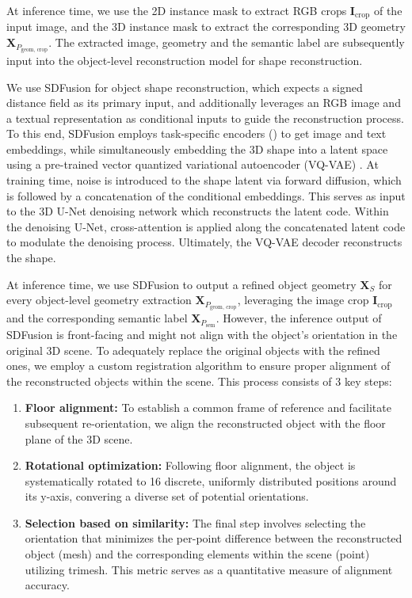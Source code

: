 At inference time, we use the 2D instance mask to extract RGB crops $\mathbf{I}_{\text{crop}}$ of the input image, and the 3D instance mask to extract the corresponding 3D geometry $\textbf{X}_{P_{\text{geom, crop}}}$.
The extracted image, geometry and the semantic label are subsequently input into the object-level reconstruction model for shape reconstruction.

We use SDFusion \citep{cheng2023sdfusion} for object shape reconstruction, which expects a signed distance field as its primary input, and additionally leverages an RGB image and a textual representation as conditional inputs to guide the reconstruction process. To this end, SDFusion employs task-specific encoders (\citep{radford2021learning, devlin2018bert}) to get image and text embeddings, while simultaneously embedding the 3D shape into a latent space using a pre-trained vector quantized variational autoencoder (VQ-VAE) \citep{oord2017neural}. At training time, noise is introduced to the shape latent via forward diffusion, which is followed by a concatenation of the conditional embeddings. This serves as input to the 3D U-Net \citep{cciccek20163d} denoising network which reconstructs the latent code. Within the denoising U-Net, cross-attention is applied along the concatenated latent code to modulate the denoising process. Ultimately, the VQ-VAE decoder reconstructs the shape.

At inference time, we use SDFusion to output a refined object geometry $\mathbf{X}_S$ for every object-level geometry extraction $\mathbf{X}_{P_{\text{geom, crop}}}$, leveraging the image crop $\mathbf{I}_{\text{crop}}$ and the corresponding semantic label $\mathbf{X}_{P_{\text{sem}}}$.
However, the inference output of SDFusion is front-facing and might not align with the object's orientation in the original 3D scene. To adequately replace the original objects with the refined ones, we employ a custom registration algorithm to ensure proper alignment of the reconstructed objects within the scene. This process consists of 3 key steps:
\begin{enumerate}
    \item \textbf{Floor alignment:} To establish a common frame of reference and facilitate subsequent re-orientation, we align the reconstructed object with the floor plane of the 3D scene.
    
    \item \textbf{Rotational optimization:} Following floor alignment, the object is systematically rotated to 16 discrete, uniformly distributed positions around its y-axis, convering a diverse set of potential orientations.
    
    \item \textbf{Selection based on similarity:} The final step involves selecting the orientation that minimizes the per-point difference between the reconstructed object (mesh) and the corresponding elements within the scene (point) utilizing trimesh. This metric serves as a quantitative measure of alignment accuracy.
\end{enumerate}
